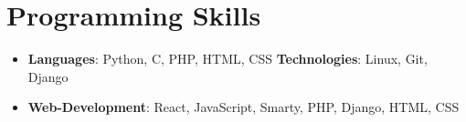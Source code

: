 \documentclass[letterpaper,11pt]{article}
\newcommand{\resumeSubHeadingListStart}{\begin{itemize}[leftmargin=*]}
\newcommand{\resumeSubHeadingListEnd}{\end{itemize}}
\begin{document}
\section{\Large{\textbf{Programming Skills}}}

  \resumeSubHeadingListStart
    \item{
      \textbf{Languages}{: Python, C, PHP, HTML, CSS}
      \hfill
      \textbf{Technologies}{: Linux, Git, Django}
    }
    \item{
      \textbf{Web-Development}{: React, JavaScript, Smarty, PHP, Django, HTML, CSS}
    }
  \resumeSubHeadingListEnd


\end{document}
